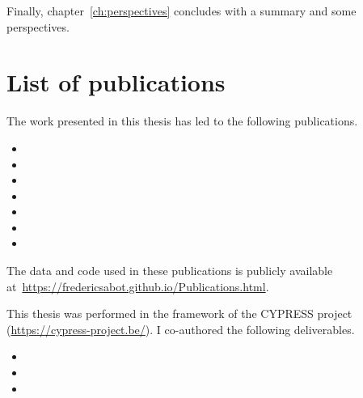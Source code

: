 Finally, chapter~\ref{ch:perspectives} concludes with a summary and some perspectives.

\section{List of publications}

The work presented in this thesis has led to the following publications.

\begin{itemize}
    \item {}
    \item {}
    \item {}
    \item {}
    \item {}
    \item {}
    \item {}
\end{itemize}

The data and code used in these publications is publicly available at~\url{https://fredericsabot.github.io/Publications.html}.

This thesis was performed in the framework of the CYPRESS project (\url{https://cypress-project.be/}). I co-authored the following deliverables.

\begin{itemize}
    \item {}
    \item {}
    \item {}
\end{itemize}

